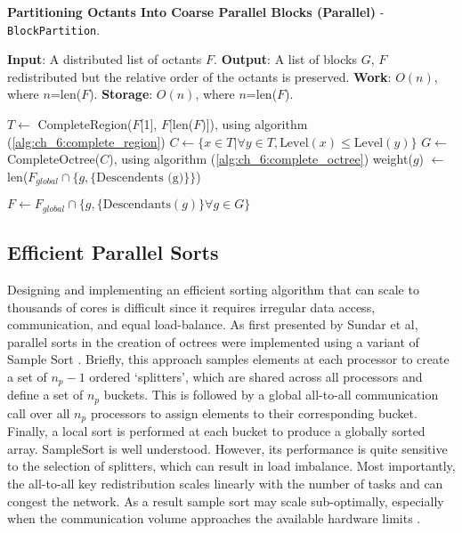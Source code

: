 \begin{algorithm}
    \caption{\textbf{Partitioning Octants Into Coarse Parallel Blocks (Parallel)} - \texttt{BlockPartition}.}
    \label{alg:ch_6:block_partition}
    \begin{algorithmic}
        \STATE \textbf{Input}: A distributed list of octants $F$.
        \STATE \textbf{Output}: A list of blocks $G$, $F$ redistributed but the relative order of the octants is preserved. 
        \STATE \textbf{Work}: $O(n)$, where $n$=len($F$).
        \STATE \textbf{Storage}: $O(n)$, where $n$=len($F$).

        \STATE $T \gets $ CompleteRegion($F$[1], $F$[len($F$)]), using algorithm (\ref{alg:ch_6:complete_region})
        \STATE $C \gets \{ x \in T | \forall y \in T, \text{Level}(x) \leq \text{Level}(y) \}$
        \STATE $G \gets $ CompleteOctree($C$), using algorithm (\ref{alg:ch_6:complete_octree})
            weight($g$) $\gets $ len($F_{global} \cap \{ g,  \{ \text{Descendents (g)} \} \}$)
        \ENDFOR

        \STATE $F \gets F_{global} \cap \{ g, \{ \text{Descendants}(g) \} \forall g \in G \}$
    \end{algorithmic}
\end{algorithm}


\subsection*{Efficient Parallel Sorts}

Designing and implementing an efficient sorting algorithm that can scale to thousands of cores is difficult since it requires irregular data access, communication, and equal load-balance. As first presented by Sundar et al, parallel sorts in the creation of octrees were implemented using a variant of Sample Sort \cite{sundar2008bottom}. Briefly, this approach samples elements at each processor to create a set of $n_p - 1 $ ordered `splitters', which are shared across all processors and define a set of $n_p$ buckets. This is followed by a global all-to-all communication call over all $n_p$ processors to assign elements to their corresponding bucket. Finally, a local sort is performed at each bucket to produce a globally sorted array. SampleSort is well understood. However, its performance is quite sensitive to the selection of splitters, which can result in load imbalance. Most importantly, the all-to-all key redistribution scales linearly with the number of tasks and can congest the network. As a result sample sort may scale sub-optimally, especially when the communication volume approaches the available hardware limits \cite{sundar2013hyksort}.

